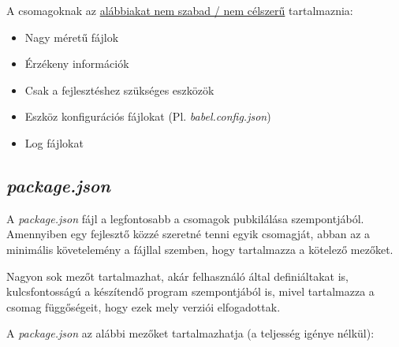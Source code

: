 A csomagoknak az \underline{alábbiakat nem szabad / nem célszerű} tartalmaznia:

\begin{itemize}
	\item Nagy méretű fájlok
	\item Érzékeny információk
	\item Csak a fejlesztéshez szükséges eszközök
	\item Eszköz konfigurációs fájlokat (Pl. \emph{babel.config.json})
	\item Log fájlokat
\end{itemize}

\begin{flushright}
	\cite{npm-packages}
\end{flushright}

	\subsection{\emph{package.json}}
	
	A \emph{package.json} fájl a legfontosabb a csomagok pubkilálása szempontjából. Amennyiben egy fejlesztő közzé szeretné tenni egyik csomagját, abban az a minimális követelemény a fájllal szemben, hogy tartalmazza a kötelező mezőket.
	
	Nagyon sok mezőt tartalmazhat, akár felhasználó által definiáltakat is, kulcsfontosságú a készítendő program szempontjából is, mivel tartalmazza a csomag függőségeit, hogy ezek mely verziói elfogadottak.
	
	A \emph{package.json} az alábbi mezőket tartalmazhatja (a teljesség igénye nélkül):
	
